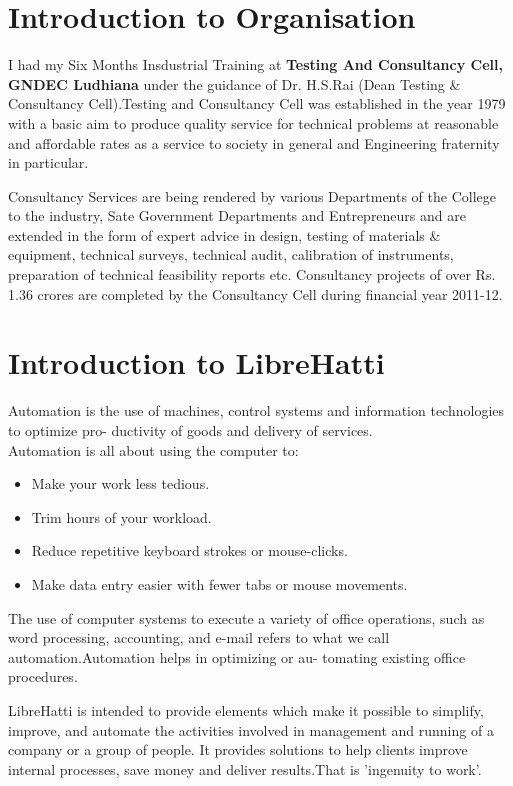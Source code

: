 \documentclass[12pt]{article}
\begin{document}
\newpage
\tableofcontents
\newpage


\section{Introduction to Organisation}
I had my Six Months Insdustrial Training at {\bf Testing And Consultancy Cell, GNDEC Ludhiana} under the guidance of Dr. H.S.Rai (Dean Testing & Consultancy Cell).Testing and Consultancy Cell was established in the year 1979 with a basic aim to produce quality service for technical problems at reasonable and affordable rates as a service to society in general and Engineering fraternity in particular. \par
   Consultancy Services are being rendered by various Departments of the College to the industry,
Sate Government Departments and Entrepreneurs and are extended in the form of expert advice
in design, testing of materials & equipment, technical surveys, technical audit, calibration of
instruments, preparation of technical feasibility reports etc. Consultancy projects of over Rs. 1.36
crores are completed by the Consultancy Cell during financial year 2011-12.
\newpage


\section{Introduction to LibreHatti}
Automation is the use of machines, control systems and information technologies to optimize pro-
ductivity of goods and delivery of services.\\ 
Automation is all about using the computer to:\\


\begin{itemize}
\item Make your work less tedious.
\item Trim hours of your workload.
\item Reduce repetitive keyboard strokes or mouse-clicks.
\item Make data entry easier with fewer tabs or mouse movements.
\end{itemize}
The use of computer systems to execute a variety of office operations, such as word processing,
accounting, and e-mail refers to what we call automation.Automation helps in optimizing or au-
tomating existing office procedures.\par
LibreHatti is intended to provide elements which make it possible to simplify, improve, and
automate the activities involved in management and running of a company or a group of people.
It provides solutions to help clients improve internal processes, save money and deliver results.That is 'ingenuity to work'.
\end{document}
